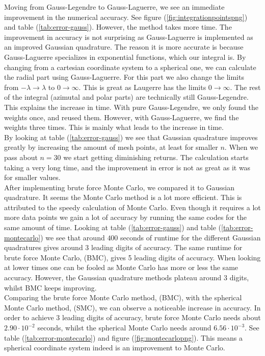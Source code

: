 \documentclass{article}
\begin{document}
Moving from Gauss-Legendre to Gauss-Laguerre, we see an immediate improvement in the numerical accuracy. See figure (\ref{fig:integrationpointspng}) and table (\ref{tab:error-gauss}). However, the method takes more time. The improvement in accuracy is not surprising as Gauss-Laguerre is implemented as an improved Gaussian quadrature. The reason it is more accurate is because Gauss-Laguerre specializes in exponential functions, which our integral is. By changing from a cartesian coordinate system to a spherical one, we can calculate the radial part using Gauss-Laguerre. For this part we also change the limits from $-\lambda \to \lambda$ to $0 \to \infty$. This is great as Laugerre has the limits $0 \to \infty$. The rest of the integral (azimutal and polar parts) are technically still Gauss-Legendre. This explains the increase in time. With pure Gauss-Legendre, we only found the weights once, and reused them. However, with Gauss-Laguerre, we find the weights three times. This is mainly what leads to the increase in time. \\

By looking at table (\ref{tab:error-gauss}) we see that Gaussian quadrature improves greatly by increasing the amount of mesh points, at least for smaller $n$. When we pass about $n=30$ we start getting diminishing returns. The calculation starts taking a very long time, and the improvement in error is not as great as it was for smaller values. \\

After implementing brute force Monte Carlo, we compared it to Gaussian quadrature. It seems the Monte Carlo method is a lot more efficient. This is attributed to the speedy calculation of Monte Carlo. Even though it requires a lot more data points we gain a lot of accuracy by running the same codes for the same amount of time. Looking at table (\ref{tab:error-gauss}) and table (\ref{tab:error-montecarlo}) we see that around $400$ seconds of runtime for the different Gaussian quadratures gives around 3 leading digits of accuracy. The same runtime for brute force Monte Carlo, (BMC), gives 5 leading digits of accuracy. When looking at lower times one can be fooled as Monte Carlo has more or less the same accuracy. However, the Gaussian quadrature methods plateau around 3 digits, whilst BMC keeps improving. \\

Comparing the brute force Monte Carlo method, (BMC), with the spherical Monte Carlo method, (SMC), we can observe a noticeable increase in accuracy. In order to achieve 3 leading digits of accuracy, brute force Monte Carlo needs about $2.90\cdot10^{-2}$ seconds, whilst the spherical Monte Carlo needs around $6.56\cdot10^{-3}$. See table (\ref{tab:error-montecarlo}) and figure (\ref{fig:montecarlopng}). This means a spherical coordinate system indeed is an improvement to Monte Carlo. \\
\end{document}

